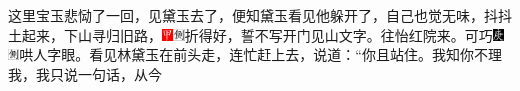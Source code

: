 这里宝玉悲恸了一回，见黛玉去了，便知黛玉看见他躲开了，自己也觉无味，抖抖土起来，下山寻归旧路，{\includegraphics[width=3mm]{../Images/00002}\includegraphics[width=3mm]{../Images/00011}\footnotesize \kaishu 折得好，誓不写开门见山文字。}往怡红院来。可巧{\includegraphics[width=3mm]{../Images/00004}\includegraphics[width=3mm]{../Images/00011}\footnotesize \kaishu 哄人字眼。}看见林黛玉在前头走，连忙赶上去，说道：“你且站住。我知你不理我，我只说一句话，从今